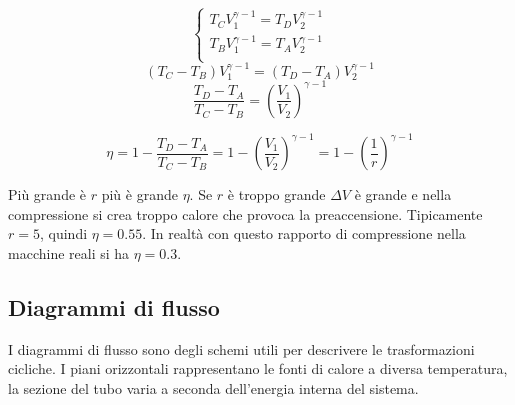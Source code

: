 \[\left\{
   \begin{array}{l}
      T_CV_1^{\gamma-1}=T_DV_2^{\gamma-1} \\
      T_BV_1^{\gamma-1}=T_AV_2^{\gamma-1} \\
   \end{array}\right.\]
\[(T_C-T_B)V_1^{\gamma-1}=(T_D-T_A)V_2^{\gamma-1}\]
\[\frac{T_D-T_A}{T_C-T_B}=\left(\frac{V_1}{V_2}\right)^{\gamma-1}\]

\[\eta=1-\frac{T_D-T_A}{T_C-T_B}=1-\left(\frac{V_1}{V_2}\right)^{\gamma-1}\!\!\!\!\!\!\!\!\! =1-\left(\frac{1}{r}\right)^{\gamma-1}\]

Più grande è $r$ più è grande $\eta$. Se $r$ è troppo grande $\Delta V$ è grande e nella compressione si crea troppo calore che provoca la preaccensione. Tipicamente $r=5$, quindi $\eta=0.55$. In realtà con questo rapporto di compressione nella macchine reali si ha $\eta=0.3$.

\subsection{Diagrammi di flusso}
I diagrammi di flusso sono degli schemi utili per descrivere le trasformazioni cicliche. I piani orizzontali rappresentano le fonti di calore a diversa temperatura, la sezione del tubo varia a seconda dell'energia interna del sistema.

